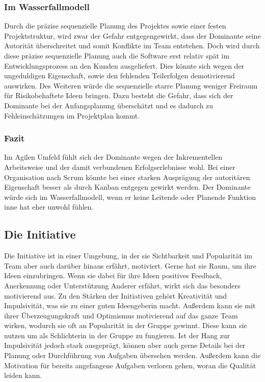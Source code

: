 \documentclass[twocolumn,10pt]{asme2ej}
\begin{document}
\subsubsection{Im Wasserfallmodell}
Durch die präzise sequenzielle Planung des Projektes sowie einer festen Projektstruktur, wird zwar der Gefahr entgegengewirkt, dass der Dominante seine Autorität überschreitet und somit Konflikte im Team entstehen. Doch wird durch diese präzise sequenzielle Planung auch die Software erst relativ spät im Entwicklungsprozess an den Kunden ausgeliefert. Dies könnte sich wegen der ungeduldigen Eigenschaft, sowie den fehlenden Teilerfolgen demotivierend auswirken. Des Weiteren würde die sequenzielle starre Planung weniger Freiraum für Risikobehaftete Ideen bringen. Dazu besteht die Gefahr, dass sich der Dominante bei der Anfangsplanung überschätzt und es dadurch zu Fehleinschätzungen im Projektplan kommt.

\subsubsection{Fazit}
Im Agilen Umfeld fühlt sich der Dominante wegen der Inkrementellen Arbeitsweise und der damit verbundenen Erfolgserlebnisse wohl. Bei einer Organisation nach Scrum könnte bei einer starken Ausprägung der autoritären Eigenschaft besser als durch Kanban entgegen gewirkt werden. Der Dominante würde sich im Wasserfallmodell, wenn er keine Leitende oder Planende Funktion inne hat eher unwohl fühlen.

\subsection{Die Initiative}
Die Initiative ist in einer Umgebung, in der sie Sichtbarkeit und Popularität im Team aber auch darüber hinaus erfährt, motiviert. Gerne hat sie Raum, um ihre Ideen einzubringen. Wenn sie dabei für ihre Ideen positives Feedback, Anerkennung oder Unterstützung Anderer erfährt, wirkt sich das besonders motivierend aus. Zu den Stärken der Initiativen gehört Kreativität und Impulsivität, was sie zu einer guten Ideengeberin macht. Außerdem kann sie mit ihrer Überzeugungskraft und Optimismus motivierend auf das ganze Team wirken, wodurch sie oft an Popularität in der Gruppe gewinnt. Diese kann sie nutzen um als Schlichterin in der Gruppe zu fungieren. Ist der Hang zur Impulsivität jedoch stark ausgeprägt, können aber auch gerne Details bei der Planung oder Durchführung von Aufgaben übersehen werden. Außerdem kann die Motivation für bereits angefangene Aufgaben verloren gehen, woran die Qualität leiden kann.
\end{document}
